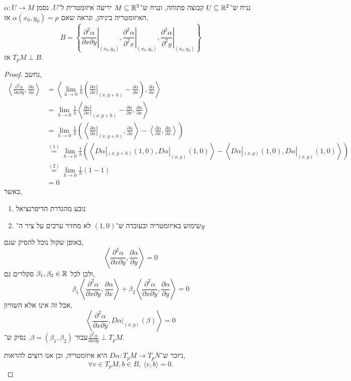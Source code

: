 \subquestion{}
נניח ש־$U \subseteq \mathbb{R}^2$ קבוצה פתוחה, ונניח ש־$M \subseteq \mathbb{R}^3$ יריעה איזומטרית ל־$U$.
נסמן $\alpha : U \to M$ האיזומטריה ביניהן, ונראה שאם $\alpha(x_0, y_0) = p$ אז,
\[
	B = 
	\left\{
	\left. \frac{\partial^2 \alpha}{\partial x \partial y} \right\rvert_{(x_0, y_0)},
	\left. \frac{\partial^2 \alpha}{\partial^2 x} \right\rvert_{(x_0, y_0)},
	\left. \frac{\partial^2 \alpha}{\partial^2 y} \right\rvert_{(x_0, y_0)}
	\right\}
\]
אז $T_p M \perp B$.
\begin{proof}
	נחשב,
	\begin{align*}
		\left\langle \frac{\partial^2 \alpha}{\partial x \partial y}, \frac{\partial \alpha}{\partial x} \right\rangle
		& = \left\langle \lim_{h \to 0} \frac{1}{h}\left( \left. \frac{\partial \alpha}{\partial x} \right\rvert_{(x, y + h)} - \frac{\partial \alpha}{\partial x}\right), \frac{\partial \alpha}{\partial x} \right\rangle \\
		& = \lim_{h \to 0} \frac{1}{h} \left\langle \left. \frac{\partial \alpha}{\partial x} \right\rvert_{(x, y + h)} - \frac{\partial \alpha}{\partial x}, \frac{\partial \alpha}{\partial x} \right\rangle \\
		& = \lim_{h \to 0} \frac{1}{h} \left( \left\langle \left. \frac{\partial \alpha}{\partial x} \right\rvert_{(x, y + h)}, \frac{\partial \alpha}{\partial x} \right\rangle
		- \left\langle \frac{\partial \alpha}{\partial x}, \frac{\partial \alpha}{\partial x} \right\rangle \right) \\
		& \overset{(1)}{=} \lim_{h \to 0} \frac{1}{h} \left( \left\langle D \alpha |_{(x, y + h)}(1, 0), D \alpha |_{(x, y)}(1, 0) \right\rangle
		- \left\langle D \alpha |_{(x, y)}(1, 0), D \alpha |_{(x, y)}(1, 0) \right\rangle \right) \\
		& \overset{(2)}{=} \lim_{h \to 0} \frac{1}{h} (1 - 1) \\
		& = 0
	\end{align*}
	כאשר,
	\begin{enumerate}
		\item נובע מהגדרת הדיפרנציאל
		\item שימוש באיזומטריה ובעובדה ש־$(1, 0)$ לא מחזיר ערכים על ציר ה־$y$
	\end{enumerate}
	באופן שקול נוכל להסיק שגם,
	\[
		\left\langle \frac{\partial^2 \alpha}{\partial x \partial y}, \frac{\partial \alpha}{\partial y} \right\rangle
		= 0
	\]
	ולכן לכל $\beta_1, \beta_2 \in \mathbb{R}$ סקלרים גם,
	\[
		\beta_1 \left\langle \frac{\partial^2 \alpha}{\partial x \partial y}, \frac{\partial \alpha}{\partial x} \right\rangle
		+ \beta_2 \left\langle \frac{\partial^2 \alpha}{\partial x \partial y}, \frac{\partial \alpha}{\partial y} \right\rangle
		= 0
	\]
	אבל זה אינו אלא השוויון,
	\[
		\left\langle \frac{\partial^2 \alpha}{\partial x \partial y}, D \alpha |_{(x, y)}(\beta) \right\rangle
		= 0
	\]
	עבור $\beta = (\beta_1, \beta_2)$.
	נסיק ש־$\frac{\partial^2 \alpha}{\partial x \partial y} \perp T_p M$.

	ניזכר ש־$D \alpha : T_p M \to T_p N$ היא איזומטריה, וכן אנו רוצים להראות,
	\[
		\forall v \in T_p M, b \in B,\ 
		\langle v, b \rangle = 0
	.\]
\end{proof}


